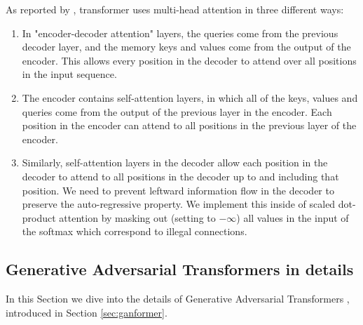 \documentclass{article}
\begin{document}
	As reported by \cite{vaswani2017attention}, transformer uses multi-head attention in three 
	different 
	ways:
	\begin{enumerate}
		\item In "encoder-decoder attention" layers, the queries come from the previous decoder 
		layer, 
		and the memory keys and values come from the output of the encoder. This allows every 
		position in the decoder to attend over all positions in the input sequence.
		\item The encoder contains self-attention layers, in which all of the keys, values 
		and queries come from the output of the previous layer in the encoder. 
		Each position in the encoder can attend to all positions in the previous layer of the encoder.
		\item Similarly, self-attention layers in the decoder allow each position in the decoder to 
		attend 
		to all positions in the decoder up to and including that position. We need to prevent leftward 
		information flow in the decoder to preserve the auto-regressive property. We implement 
		this 
		inside of scaled dot-product attention by masking out (setting to $-\infty$) all values in the 
		input of the softmax which correspond to illegal connections. 
	\end{enumerate}
	
	
	\subsection{Generative Adversarial Transformers in details}\label{subsec:app_methodology}
	In this Section we dive into the details of Generative Adversarial Transformers 
	\cite{hudson2021generative}, introduced in Section \ref{sec:ganformer}. 
	
\end{document}
